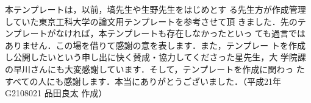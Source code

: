 \theacknowledgments 本テンプレートは，以前，塙先生や生野先生をはじめとす
る先生方が作成管理していた東京工科大学の論文用テンプレートを参考させて頂
きました．先のテンプレートがなければ，本テンプレートも存在しなかったといっ
ても過言ではありません．この場を借りて感謝の意を表します．また，テンプレー
トを作成し公開したいという申し出に快く賛成・協力してくださった星先生，大
学院課の早川さんにも大変感謝しています．そして，テンプレートを作成に関わっ
たすべての人にも感謝します．本当にありがとうございました．（平成21年
G2108021 品田良太 作成）
